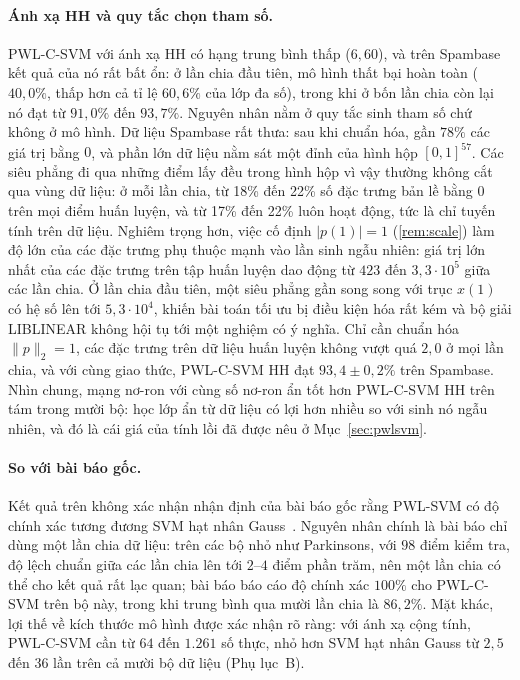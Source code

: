\paragraph{Ánh xạ HH và quy tắc chọn tham số.} PWL-C-SVM với ánh xạ HH có hạng trung bình thấp ($6{,}60$), và trên Spambase kết quả của nó rất bất ổn: ở lần chia đầu tiên, mô hình thất bại hoàn toàn ($40{,}0\%$, thấp hơn cả tỉ lệ $60{,}6\%$ của lớp đa số), trong khi ở bốn lần chia còn lại nó đạt từ $91{,}0\%$ đến $93{,}7\%$. Nguyên nhân nằm ở quy tắc sinh tham số chứ không ở mô hình. Dữ liệu Spambase rất thưa: sau khi chuẩn hóa, gần $78\%$ các giá trị bằng $0$, và phần lớn dữ liệu nằm sát một đỉnh của hình hộp $[0,1]^{57}$. Các siêu phẳng đi qua những điểm lấy đều trong hình hộp vì vậy thường không cắt qua vùng dữ liệu: ở mỗi lần chia, từ 18\% đến 22\% số đặc trưng bản lề bằng $0$ trên mọi điểm huấn luyện, và từ 17\% đến 22\% luôn hoạt động, tức là chỉ tuyến tính trên dữ liệu. Nghiêm trọng hơn, việc cố định $|p(1)|=1$ (\cref{rem:scale}) làm độ lớn của các đặc trưng phụ thuộc mạnh vào lần sinh ngẫu nhiên: giá trị lớn nhất của các đặc trưng trên tập huấn luyện dao động từ $423$ đến $3{,}3\cdot10^{5}$ giữa các lần chia. Ở lần chia đầu tiên, một siêu phẳng gần song song với trục $x(1)$ có hệ số lên tới $5{,}3\cdot10^{4}$, khiến bài toán tối ưu bị điều kiện hóa rất kém và bộ giải LIBLINEAR không hội tụ tới một nghiệm có ý nghĩa. Chỉ cần chuẩn hóa $\|p\|_2=1$, các đặc trưng trên dữ liệu huấn luyện không vượt quá $2{,}0$ ở mọi lần chia, và với cùng giao thức, PWL-C-SVM HH đạt $93{,}4\pm0{,}2\%$ trên Spambase. Nhìn chung, mạng nơ-ron với cùng số nơ-ron ẩn tốt hơn PWL-C-SVM HH trên tám trong mười bộ: học lớp ẩn từ dữ liệu có lợi hơn nhiều so với sinh nó ngẫu nhiên, và đó là cái giá của tính lồi đã được nêu ở Mục~\ref{sec:pwlsvm}.

\paragraph{So với bài báo gốc.} Kết quả trên không xác nhận nhận định của bài báo gốc rằng PWL-SVM có độ chính xác tương đương SVM hạt nhân Gauss~\cite{huang2013}. Nguyên nhân chính là bài báo chỉ dùng một lần chia dữ liệu: trên các bộ nhỏ như Parkinsons, với $98$ điểm kiểm tra, độ lệch chuẩn giữa các lần chia lên tới $2$--$4$ điểm phần trăm, nên một lần chia có thể cho kết quả rất lạc quan; bài báo báo cáo độ chính xác $100\%$ cho PWL-C-SVM trên bộ này, trong khi trung bình qua mười lần chia là $86{,}2\%$. Mặt khác, lợi thế về kích thước mô hình được xác nhận rõ ràng: với ánh xạ cộng tính, PWL-C-SVM cần từ $64$ đến $1.261$ số thực, nhỏ hơn SVM hạt nhân Gauss từ $2{,}5$ đến $36$ lần trên cả mười bộ dữ liệu (Phụ lục~B).

